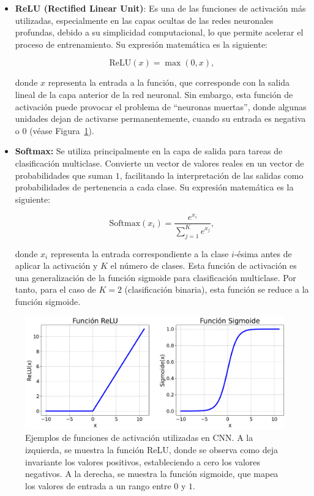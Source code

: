 \begin{itemize}
    \item \textbf{ReLU (Rectified Linear Unit)}: Es una de las funciones de activación más utilizadas, especialmente en las capas ocultas de las redes neuronales profundas, debido a su simplicidad computacional, lo que permite acelerar el proceso de entrenamiento. Su expresión matemática es la siguiente:
    
    \[
        \text{ReLU}(x) = \max(0, x),
    \]

    donde $x$ representa la entrada a la función, que corresponde con la salida lineal de la capa anterior de la red neuronal. Sin embargo, esta función de activación puede provocar el problema de ``neuronas muertas'', donde algunas unidades dejan de activarse permanentemente, cuando su entrada es negativa o $0$ (véase Figura~\ref{fig:funcionesactivacion}).

    \item \textbf{Softmax:} Se utiliza principalmente en la capa de salida para tareas de clasificación multiclase. Convierte un vector de valores reales en un vector de probabilidades que suman $1$, facilitando la interpretación de las salidas como probabilidades de pertenencia a cada clase. Su expresión matemática es la siguiente:
 
    \[
        \text{Softmax}(x_i) = \frac{e^{x_i}}{\sum_{j=1}^{K} e^{x_j}},
    \]

    donde $x_i$ representa la entrada correspondiente a la clase $i$-ésima antes de aplicar la activación y $K$ el número de clases. Esta función de activación es una generalización de la función sigmoide para clasificación multiclase. Por tanto, para el caso de $K=2$ (clasificación binaria), esta función se reduce a la función sigmoide.

\end{itemize}

\begin{figure}[h]
    \centering
    \includegraphics[width=0.8\linewidth]{img/funcionesactivacion.png}
    \caption[Ejemplos de funciones de activación utilizadas en CNN.]{Ejemplos de funciones de activación utilizadas en CNN. A la izquierda, se muestra la función ReLU, donde se observa como deja invariante los valores positivos, estableciendo a cero los valores negativos. A la derecha, se muestra la función sigmoide, que mapea los valores de entrada a un rango entre $0$ y $1$.}\label{fig:funcionesactivacion}
\end{figure}

